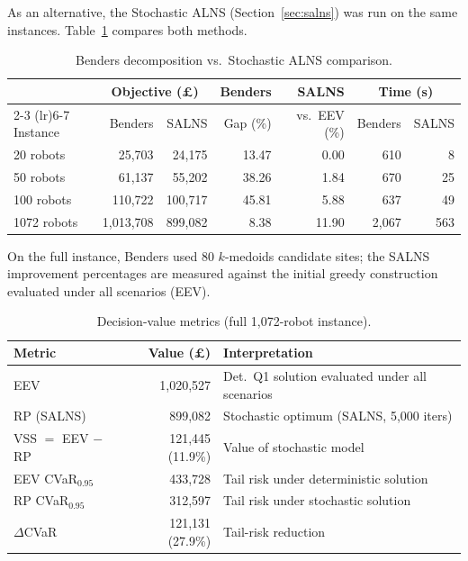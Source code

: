 \documentclass[11pt,a4paper]{article}
\begin{document}
\noindent
As an alternative, the Stochastic ALNS (Section~\ref{sec:salns}) was run on the same instances.
Table~\ref{tab:q2-comparison} compares both methods.

\begin{table}[H]
\centering
\caption{Benders decomposition vs.\ Stochastic ALNS comparison.}
\label{tab:q2-comparison}
\begin{tabular}{lrrrrrr}
\toprule
 & \multicolumn{2}{c}{Objective (\pounds)} & Benders & SALNS & \multicolumn{2}{c}{Time (s)} \\
\cmidrule(lr){2-3} \cmidrule(lr){6-7}
Instance & Benders & SALNS & Gap (\%) & vs.\ EEV (\%) & Benders & SALNS \\
\midrule
20 robots   & 25,703 & 24,175 & 13.47 & 0.00  & 610  & 8   \\
50 robots   & 61,137 & 55,202 & 38.26 & 1.84  & 670  & 25  \\
100 robots  & 110,722 & 100,717 & 45.81 & 5.88 & 637  & 49  \\
1072 robots & 1,013,708 & 899,082 & 8.38 & 11.90 & 2,067 & 563 \\
\bottomrule
\end{tabular}
\end{table}

\noindent
On the full instance, Benders used 80 $k$-medoids candidate sites; the SALNS improvement percentages are measured against the initial greedy construction evaluated under all scenarios (EEV).

\begin{table}[H]
\centering
\caption{Decision-value metrics (full 1,072-robot instance).}
\label{tab:q2-vss}
\begin{tabular}{lrl}
\toprule
Metric & Value (\pounds) & Interpretation \\
\midrule
EEV & 1,020,527 & Det.\ Q1 solution evaluated under all scenarios \\
RP (SALNS)  & 899,082 & Stochastic optimum (SALNS, 5,000 iters) \\
\midrule
VSS $=$ EEV $-$ RP & 121,445\; (11.9\%) & Value of stochastic model \\
\midrule
EEV CVaR$_{0.95}$ & 433,728 & Tail risk under deterministic solution \\
RP CVaR$_{0.95}$  & 312,597 & Tail risk under stochastic solution \\
$\Delta$CVaR      & 121,131\; (27.9\%) & Tail-risk reduction \\
\bottomrule
\end{tabular}
\end{table}
\end{document}
